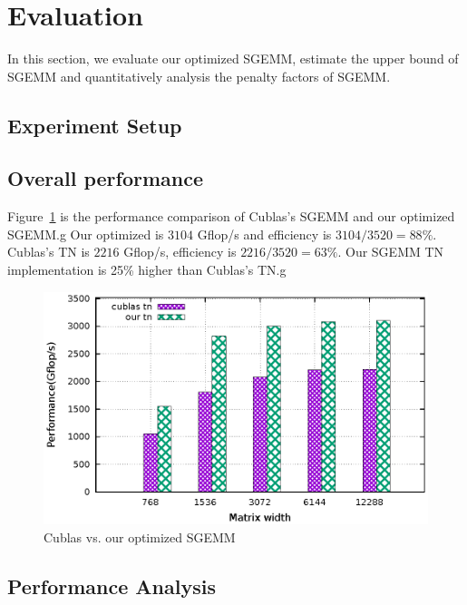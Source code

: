 \documentclass{sig-alternate-05-2015}
\begin{document}
\section{Evaluation}
In this section, we evaluate our optimized SGEMM, estimate the upper bound of SGEMM and quantitatively analysis the penalty factors of SGEMM.
\subsection{Experiment Setup}

\subsection{Overall performance}
Figure~\ref{fig:sgemm_tn} is the performance comparison of Cublas's SGEMM and our optimized SGEMM.g
Our optimized is $3104$ Gflop/s and efficiency is $3104/3520=88\%$. Cublas's TN is $2216$ Gflop/s,
efficiency is $2216/3520=63\%$. Our SGEMM TN implementation is 25\% higher than Cublas's TN.g
\begin{figure}[htbp]
\begin{center}
\includegraphics[scale=0.6]{sgemm_tn}
\caption{Cublas vs. our optimized SGEMM }
\label{fig:sgemm_tn}
\end{center}
\end{figure}
\subsection{Performance Analysis}
\end{document}
